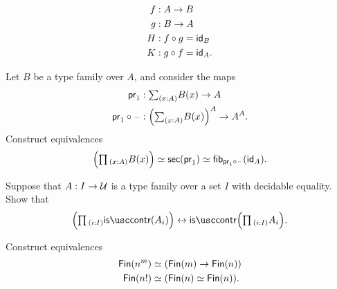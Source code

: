 \begin{exercises}
\begin{align*}
f & : A\to B \\
g & : B\to A \\
H & : f\circ g = \idfunc[B] \\
K & : g\circ f = \idfunc[A].
\end{align*}
\item \label{ex:pi_sec}Let $B$ be a type family over $A$, and consider the maps
  \begin{align*}
    \proj 1 & : \sm{x:A} B(x)\to A \\
    \proj1 \circ \blank & : \Big(\sm{x:A} B(x)\Big)^A \to A^A.
  \end{align*}
  Construct equivalences
  \begin{equation*}
    \Big(\prd{x:A}B(x)\Big) \eqvsym \sections(\proj 1) \eqvsym \fib{\proj 1 \circ\blank}{\idfunc[A]}.
  \end{equation*}
\item Suppose that $A:I\to \UU$ is a type family over a set $I$ with decidable equality. Show that
  \begin{equation*}
    \Big(\prd{i:I}\iscontr(A_i)\Big)\leftrightarrow \iscontr\Big(\prd{i:I}A_i\Big).
  \end{equation*}
\item Construct equivalences
  \begin{align*}
    \Fin(n^m) & \simeq (\Fin(m)\to\Fin(n)) \\
    \Fin(n!) & \simeq (\Fin(n)\simeq\Fin(n)).
  \end{align*}
\end{exercises}
